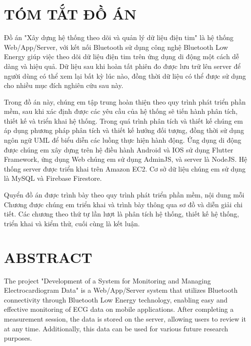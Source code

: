 \section*{TÓM TẮT ĐỒ ÁN}

Đồ án "Xây dựng hệ thống theo dõi và quản lý dữ liệu điện tim" là hệ thống Web/App/Server, với kết nối Bluetooth
sử dụng công nghệ Bluetooth Low Energy giúp việc theo dõi dữ liệu điện tim trên ứng dụng di động một cách dễ dàng và
hiệu quả. Dữ liệu sau khi hoàn tất phiên đo được lưu trữ lên server để người dùng có thể xem lại bất kỳ lúc nào, đồng thời
dữ liệu có thể được sử dụng cho nhiều mục đích nghiên cứu sau này.

Trong đồ án này, chúng em tập trung hoàn thiện theo quy trình phát triển phần mềm, sau khi xác định được các yêu cầu của hệ thống
sẽ tiến hành phân tích, thiết kế và triển khai hệ thống. Trong quá trình phân tích và thiết kế chúng em áp dụng phương pháp
phân tích và thiết kế hướng đối tượng, đồng thời sử dụng ngôn ngữ UML để biểu diễn các luồng thực hiện hành động. Ứng dụng di
động được chúng em xây dựng trên hệ điều hành Android và IOS sử dụng Flutter Framework, ứng dụng Web chúng em sử dụng AdminJS, và server
là NodeJS. Hệ thống server được triển khai trên Amazon EC2. Cơ sở dữ liệu chúng em sử dụng là MySQL và Firebase Firestore.

Quyển đồ án được trình bày theo quy trình phát triển phần mềm, nội dung mỗi Chương được chúng em triển khai và trình bày thông qua sơ đồ và diễn giải chi tiết. 
Các chương theo thứ tự lần lượt là phân tích hệ thống, thiết kế hệ thống, triển khai và kiểm thử, cuối cùng là kết luận. 

\cleardoublepage

\newpage
\section*{ABSTRACT}

The project "Development of a System for Monitoring and Managing Electrocardiogram Data" is a Web/App/Server system that utilizes Bluetooth connectivity through Bluetooth Low Energy technology, enabling easy and effective monitoring of ECG data on mobile applications. After completing a measurement session, the data is stored on the server, allowing users to review it at any time. Additionally, this data can be used for various future research purposes.

